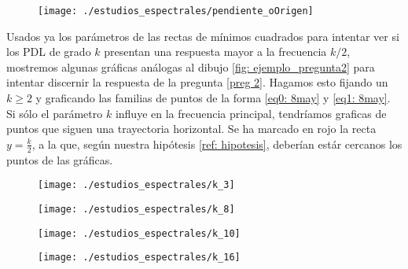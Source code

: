 \begin{figure}[H]
	\centering
	\texttt{[image: ./estudios\_espectrales/pendiente\_oOrigen]} 
\end{figure}	


Usados ya los parámetros de las rectas
de mínimos cuadrados para
intentar ver si los PDL
de grado $k$ presentan una respuesta
mayor a la frecuencia $k/2$, 
mostremos algunas gráficas análogas
al dibujo \ref{fig: ejemplo_pregunta2} 
para intentar discernir la respuesta
de la pregunta 
\ref{preg 2}.
Hagamos esto 
fijando un $k \geq 2$ y 
graficando las familias de puntos de la forma
\eqref{eq0: 8may}
y \eqref{eq1: 8may}. Si sólo el parámetro $k$ 
influye en la frecuencia principal, tendríamos graficas
de puntos que siguen una trayectoria horizontal.
Se ha marcado en rojo la recta
$y = \frac{k}{2}$, a la que, según nuestra hipótesis
\ref{ref: hipotesis}, deberían estár cercanos los
puntos de las gráficas. 

\begin{figure}[H]
	\centering
	\texttt{[image: ./estudios\_espectrales/k\_3]} 
\end{figure}

\begin{figure}[H]
	\centering
	\texttt{[image: ./estudios\_espectrales/k\_8]} 
\end{figure}

\begin{figure}[H]
	\centering
	\texttt{[image: ./estudios\_espectrales/k\_10]} 
\end{figure}

\begin{figure}[H]
	\centering
	\texttt{[image: ./estudios\_espectrales/k\_16]} 
\end{figure}

